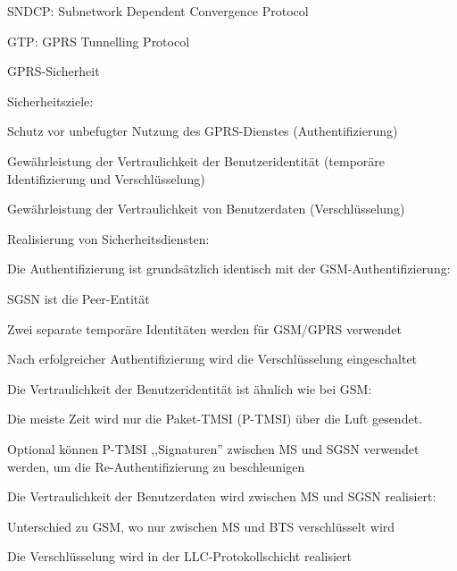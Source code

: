 \documentclass[a4paper]{article}
\begin{document}
\begin{multicols}{3}
      \begin{itemize*}
            \item SNDCP: Subnetwork Dependent Convergence Protocol
            \item GTP: GPRS Tunnelling Protocol
      \end{itemize*}

      GPRS-Sicherheit

      \begin{itemize*}
            \item Sicherheitsziele:
            \begin{itemize*}
                  \item Schutz vor unbefugter Nutzung des GPRS-Dienstes (Authentifizierung)
                  \item Gewährleistung der Vertraulichkeit der Benutzeridentität (temporäre Identifizierung und Verschlüsselung)
                  \item Gewährleistung der Vertraulichkeit von Benutzerdaten (Verschlüsselung)
            \end{itemize*}
            \item Realisierung von Sicherheitsdiensten:
            \begin{itemize*}
                  \item Die Authentifizierung ist grundsätzlich identisch mit der GSM-Authentifizierung:
                  \begin{itemize*} \item SGSN ist die Peer-Entität \item Zwei separate temporäre Identitäten werden für GSM/GPRS verwendet \item Nach erfolgreicher Authentifizierung wird die Verschlüsselung eingeschaltet \end{itemize*}
                  \item Die Vertraulichkeit der Benutzeridentität ist ähnlich wie bei GSM:
                  \begin{itemize*} \item Die meiste Zeit wird nur die Paket-TMSI (P-TMSI) über die Luft gesendet. \item Optional können P-TMSI ,,Signaturen'' zwischen MS und SGSN verwendet werden, um die Re-Authentifizierung zu beschleunigen \end{itemize*}
                  \item Die Vertraulichkeit der Benutzerdaten wird zwischen MS und SGSN realisiert:
                  \begin{itemize*} \item Unterschied zu GSM, wo nur zwischen MS und BTS verschlüsselt wird \item Die Verschlüsselung wird in der LLC-Protokollschicht realisiert \end{itemize*}
            \end{itemize*}
      \end{itemize*}


\end{multicols}
\end{document}
